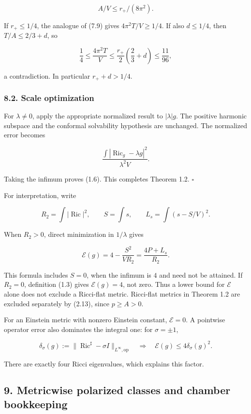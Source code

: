 \documentclass[
  10pt,
]{article}
\begin{document}
\[
                            A/V\le r_+/(8\pi^2).
\]

If \(r_+\le1/4\), the analogue of (7.9) gives \(4\pi^2T/V\ge1/4\). If
also \(d\le1/4\), then \(T/A\le2/3+d\), so

\[
  \frac14\le\frac{4\pi^2T}{V}
             \le\frac{r_+}{2}\left(\frac23+d\right)
             \le\frac{11}{96},
\]

a contradiction. In particular \(r_++d>1/4\).

\hypertarget{scale-optimization}{%
\subsubsection{8.2. Scale optimization}\label{scale-optimization}}

For \(\lambda\ne0\), apply the appropriate normalized result to
\(|\lambda|g\). The positive harmonic subspace and the conformal
solvability hypothesis are unchanged. The normalized error becomes

\[
 \frac{\int|\operatorname{Ric}_g-\lambda g|^2}{\lambda^2V}.
\]

Taking the infimum proves (1.6). This completes Theorem 1.2. \(\square\)

For interpretation, write

\[
 R_2=\int|\operatorname{Ric}|^2,\qquad S=\int s,\qquad
 L_s=\int(s-S/V)^2.
\]

When \(R_2>0\), direct minimization in \(1/\lambda\) gives

\[
              \mathcal E(g)=4-\frac{S^2}{VR_2}
                             =\frac{4P+L_s}{R_2}.        \tag{8.1}
\]

This formula includes \(S=0\), when the infimum is \(4\) and need not be
attained. If \(R_2=0\), definition (1.3) gives \(\mathcal E(g)=4\), not
zero. Thus a lower bound for \(\mathcal E\) alone does not exclude a
Ricci-flat metric. Ricci-flat metrics in Theorem 1.2 are excluded
separately by (2.13), since \(p\ge A>0\).

For an Einstein metric with nonzero Einstein constant, \(\mathcal E=0\).
A pointwise operator error also dominates the integral one: for
\(\sigma=\pm1\),

\[
 \delta_\sigma(g):=\|\operatorname{Ric}^{\sharp}-\sigma I\|_{L^\infty,\mathrm{op}}
      \quad\Longrightarrow\quad\mathcal E(g)\le4\delta_\sigma(g)^2.
 \tag{8.2}
\]

There are exactly four Ricci eigenvalues, which explains this factor.

\hypertarget{metricwise-polarized-classes-and-chamber-bookkeeping}{%
\subsection{9. Metricwise polarized classes and chamber
bookkeeping}\label{metricwise-polarized-classes-and-chamber-bookkeeping}}
\end{document}
